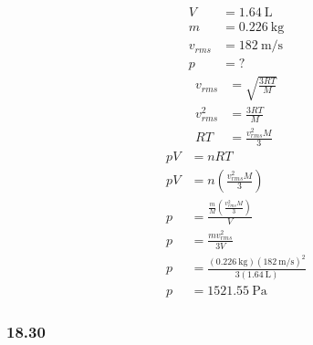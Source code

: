 \documentclass{article}
\begin{document}
\begin{align*}
	V & = \SI{1.64}{\liter} \\
	m & = \SI{0.226}{\kilogram} \\
	v_{rms} & = \SI{182}{\meter \per \second} \\
	p & = ?
\end{align*}
\begin{align*}
	v_{rms} & = \sqrt{ \frac{ 3RT }{ M } } \\
	v_{rms}^2 & = \frac{ 3RT }{ M } \\
	RT & = \frac{ v_{rms}^2M }{ 3 }
\end{align*}
\begin{align*}
	pV & = nRT \\
	pV & = n \left( \frac{ v_{rms}^2M }{ 3 } \right) \\
	p & = \frac{ \frac{ m }{ M } \left( \frac{ v_{rms}^2M }{ 3 } \right) }{ V } \\
	p & = \frac{ mv_{rms}^2 }{ 3V } \\
	p & = \frac{ (\SI{0.226}{\kilogram})(\SI{182}{\meter \per \second})^2 }{ 3(\SI{1.64}{\liter}) } \\
	p & = \SI{1521.55}{\pascal}
\end{align*}

\subsubsection{18.30}
\end{document}

